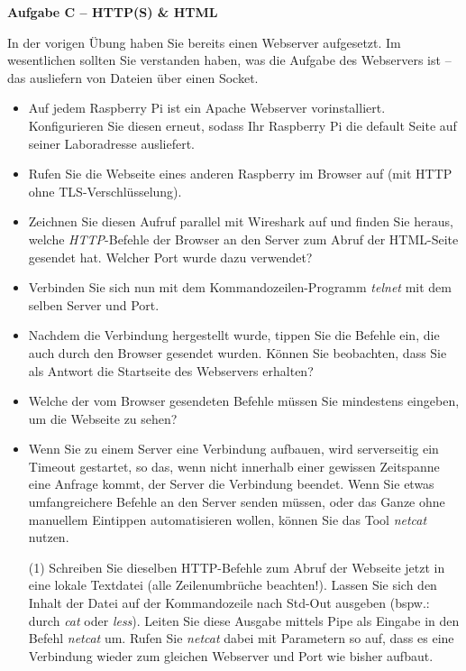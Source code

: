 \documentclass[paper=a4,fontsize=11pt]{scrartcl}%
\numberwithin{equation}{section}
\begin{document}
\newpage
\begin{center}\Large{\textbf{Aufgabe C -- HTTP(S) \& HTML}}\end{center}\vskip0.25in
In der vorigen Übung haben Sie bereits einen Webserver aufgesetzt. Im wesentlichen sollten Sie verstanden haben, was die Aufgabe des Webservers ist -- das ausliefern von Dateien über einen Socket.
\begin{itemize}
	\item Auf jedem Raspberry Pi ist ein Apache Webserver vorinstalliert. Konfigurieren Sie diesen erneut, sodass Ihr Raspberry Pi die default Seite auf seiner Laboradresse ausliefert.
	\item Rufen Sie die Webseite eines anderen Raspberry im Browser auf (mit HTTP ohne TLS-Verschlüsselung).
	\item Zeichnen Sie diesen Aufruf parallel mit Wireshark auf und finden Sie heraus, welche \emph{HTTP}-Befehle der Browser an den Server zum  Abruf der HTML-Seite gesendet hat. Welcher Port wurde dazu verwendet?
	\item Verbinden Sie sich nun mit dem Kommandozeilen-Programm \emph{telnet} mit dem selben Server und Port.
	\item Nachdem die Verbindung hergestellt wurde, tippen Sie die Befehle ein, die auch durch den Browser gesendet wurden.
	Können Sie beobachten, dass Sie als Antwort die Startseite des Webservers erhalten?
	\item Welche der vom Browser gesendeten Befehle müssen Sie mindestens eingeben, um die Webseite zu sehen?
	\item Wenn Sie zu einem Server eine Verbindung aufbauen, wird serverseitig ein Timeout gestartet, so das, wenn nicht innerhalb einer gewissen Zeitspanne eine Anfrage kommt, der Server die Verbindung beendet. Wenn Sie etwas umfangreichere Befehle an den Server senden müssen, oder das Ganze ohne manuellem Eintippen automatisieren wollen, können Sie das Tool \emph{netcat} nutzen.
	\begin{tasks}(1)
		\task Schreiben Sie dieselben HTTP-Befehle zum Abruf der Webseite jetzt in eine lokale Textdatei (alle Zeilenumbrüche beachten!).
		\task Lassen Sie sich den Inhalt der Datei auf der Kommandozeile nach Std-Out ausgeben (bspw.: durch \emph{cat} oder \emph{less}).
		\task Leiten Sie diese Ausgabe mittels Pipe als Eingabe in den Befehl \emph{netcat} um. Rufen Sie \emph{netcat} dabei mit  Parametern so auf, dass es eine Verbindung wieder zum gleichen Webserver und Port wie bisher aufbaut.\\

\end{tasks}
\end{itemize}
\end{document}
